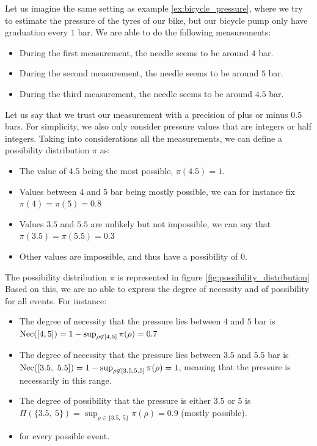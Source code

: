 \begin{example}\label{ex:bicycle_pressure_possibility}
    Let us imagine the same setting as example \ref{ex:bicycle_pressure}, where we try to estimate the pressure of the tyres of our bike, but our bicycle pump only have graduation every $1$ bar. We are able to do the following measurements:
    \begin{itemize}
        \item During the first measurement, the needle seems to be around $4$ bar.
        \item During the second measurement, the needle seems to be around $5$ bar.
        \item During the third measurement, the needle seems to be around $4.5$ bar.
    \end{itemize}
    Let us say that we trust our measurement with a precision of plus or minus $0.5$ bars. For simplicity, we also only consider pressure values that are integers or half integers. Taking into considerations all the measurements, we can define a possibility distribution $\pi$ as:
    \begin{itemize}
        \item The value of $4.5$ being the most possible, $\pi(4.5)=1$.
        \item Values between $4$ and $5$ bar being mostly possible, we can for instance fix $\pi(4)=\pi(5)=0.8$
        \item Values $3.5$ and $5.5$ are unlikely but not impossible, we can say that $\pi(3.5)=\pi(5.5)=0.3$
        \item Other values are impossible, and thus have a possibility of $0$.
    \end{itemize}
    The possibility distribution $\pi$ is represented in figure \ref{fig:possibility_distribution}
    Based on this, we are no able to express the degree of necessity and of possibility for all events. For instance:
    \begin{itemize}
        \item The degree of necessity that the pressure lies between $4$ and $5$ bar is ${\mathrm{Nec}}([4, 5])=1-\sup_{\rho\not\in[4,5]}\pi(\rho)=0.7$
        \item The degree of necessity that the pressure lies between $3.5$ and $5.5$ bar is ${\mathrm{Nec}}([3.5,~ 5.5]) = 1-\sup_{\rho\not\in[3.5,5.5]}\pi(\rho) = 1$, meaning that the pressure is necessarily in this range.
        \item The degree of possibility that the pressure is either $3.5$ or  $5$ is $\Pi (\{3.5,~5\})=\sup_{\rho\in\{3.5,~5\}}\pi(\rho)=0.9$ (mostly possible).
        \item \etc for every possible event.
    \end{itemize}
\end{example}

